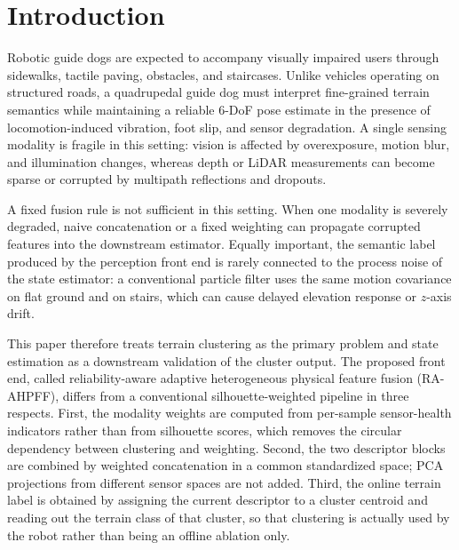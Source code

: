 \documentclass[final,3p,times]{elsarticle}
\begin{document}
\section{Introduction}
\label{sec:intro}
Robotic guide dogs are expected to accompany visually impaired users through sidewalks, tactile paving, obstacles, and staircases. Unlike vehicles operating on structured roads, a quadrupedal guide dog must interpret fine-grained terrain semantics while maintaining a reliable 6-DoF pose estimate in the presence of locomotion-induced vibration, foot slip, and sensor degradation. A single sensing modality is fragile in this setting: vision is affected by overexposure, motion blur, and illumination changes, whereas depth or LiDAR measurements can become sparse or corrupted by multipath reflections and dropouts.

A fixed fusion rule is not sufficient in this setting. When one modality is severely degraded, naive concatenation or a fixed weighting can propagate corrupted features into the downstream estimator. Equally important, the semantic label produced by the perception front end is rarely connected to the process noise of the state estimator: a conventional particle filter uses the same motion covariance on flat ground and on stairs, which can cause delayed elevation response or $z$-axis drift.

This paper therefore treats terrain clustering as the primary problem and state estimation as a downstream validation of the cluster output. The proposed front end, called reliability-aware adaptive heterogeneous physical feature fusion (RA-AHPFF), differs from a conventional silhouette-weighted pipeline in three respects. First, the modality weights are computed from per-sample sensor-health indicators rather than from silhouette scores, which removes the circular dependency between clustering and weighting. Second, the two descriptor blocks are combined by weighted concatenation in a common standardized space; PCA projections from different sensor spaces are not added. Third, the online terrain label is obtained by assigning the current descriptor to a cluster centroid and reading out the terrain class of that cluster, so that clustering is actually used by the robot rather than being an offline ablation only.
\end{document}

